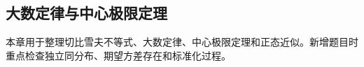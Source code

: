 \subsection{大数定律与中心极限定理}

\begin{knowledgeBox}
本章用于整理切比雪夫不等式、大数定律、中心极限定理和正态近似。新增题目时重点检查独立同分布、期望方差存在和标准化过程。
\end{knowledgeBox}
